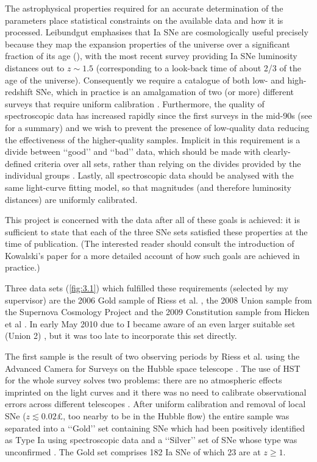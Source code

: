 The astrophysical properties required for an accurate determination of the parameters place statistical constraints on the available data and how it is processed. Leibundgut emphasises that Ia SNe are cosmologically useful precisely because they map the expansion properties of the universe over a significant fraction of its age (\cite{Leibundgut2008}), with the most recent survey \cite{Amanullah2010} providing Ia SNe luminosity distances out to $z \sim{} 1.5$ (corresponding to a look-back time of about 2/3 of the age of the universe). 
Consequently we require a catalogue of both low- and high-redshift SNe, which in practice is an amalgamation of two (or more) different surveys that require uniform calibration \cite{Kowalski2008}. Furthermore, the quality of spectroscopic data has increased rapidly since the first surveys in the mid-90s (see \cite{Leibundgut2008} for a summary) and we wish to prevent the presence of low-quality data reducing the effectiveness of the higher-quality samples. Implicit in this requirement is a divide between \lq\lq{}good\rq\rq{} and \lq\lq{}bad\rq\rq{} data, which should be made with clearly-defined criteria over all sets, rather than relying on the divides provided by the individual groups \cite{Kowalski2008}. 
Lastly, all spectroscopic data should be analysed with the same light-curve fitting model, so that magnitudes (and therefore luminosity distances) are uniformly calibrated. 

This project is concerned with the data after all of these goals is achieved: it is sufficient to state that each of the three SNe sets satisfied these properties at the time of publication. (The interested reader should consult the introduction of Kowalski’s paper \cite{Kowalski2008} for a more detailed account of how such goals are achieved in practice.) 

Three data sets (\cref{fig:3.1}) which fulfilled these requirements (selected by my supervisor) are the 2006 Gold sample of Riess et al. \cite{Riess2007}, the 2008 Union sample from the Supernova Cosmology Project \cite{Kowalski2008} and the 2009 Constitution sample from Hicken et al \cite{Hicken2009}. In early May 2010 due to \cite{Lidman2010b} I became aware of an even larger suitable set (Union 2) \cite{Amanullah2010}, but it was too late to incorporate this set directly. 

The first sample is the result of two observing periods by Riess et al. using the Advanced Camera for Surveys on the Hubble space telescope \cite{Riess2007}. The use of HST for the whole survey solves two problems: there are no atmospheric effects imprinted on the light curves \cite{Riess2007} and it there was no need to calibrate observational errors across different telescopes \cite{Leibundgut2008}. After uniform calibration and removal of local SNe ($z \lesssim{} 0.02$£, too nearby to be in the Hubble flow) the entire sample was separated into a \lq\lq{}Gold\rq\rq{} set containing SNe which had been positively identified as Type Ia using spectroscopic data and a \lq\lq{}Silver\rq\rq{} set of SNe whose type was unconfirmed \cite{Riess2007}. The Gold set comprises 182 Ia SNe of which 23 are at $z \geq{} 1$. 

